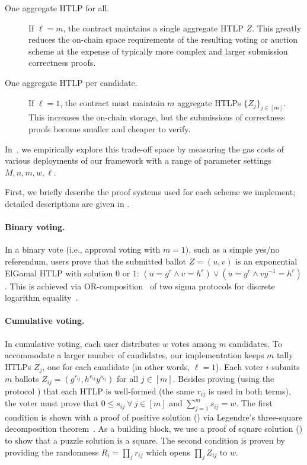 \begin{description}
    \item[One aggregate HTLP for all.] If $\ell=m$, the contract maintains a single aggregate HTLP $Z$. This greatly reduces the on-chain space requirements of the resulting voting or auction scheme at the expense of typically more complex and larger submission correctness proofs.
    \item[One aggregate HTLP per candidate.] If $\ell=1$, the contract must maintain $m$ aggregate HTLPs $\{Z_j\}_{j\in[m]}$. This increases the on-chain storage, but the submissions of correctness proofs become smaller and cheaper to verify.
\end{description}
In~, we empirically explore this trade-off space by measuring the gas costs of various deployments of our framework with a range of parameter settings $M,n,m,w,\ell$.

First, we briefly describe the proof systems used for each scheme we implement; detailed descriptions are given in .

\paragraph{Binary voting.} 
In a binary vote (i.e., approval voting with $m=1$), such as a simple yes/no referendum, users prove that the submitted ballot $Z=(u,v)$ is an exponential ElGamal HTLP with solution $0$ or $1$: $(u=g^r\land v=h^r)\lor(u=g^r\land vy^{-1}=h^r)$. This is achieved via OR-composition~\cite{C:CraDamSch94} of two sigma protocols for discrete logarithm equality~\cite{C:ChaPed92}.

\paragraph{Cumulative voting.}
In cumulative voting, each user distributes $w$ votes among $m$ candidates. To accommodate a larger number of candidates, our implementation keeps $m$ tally HTLPs $Z_j$, one for each candidate (in other words, $\ell = 1$). Each voter $i$ submits $m$ ballots $Z_{ij} = (g^{r_{ij}},h^{r_{ij}}y^{s_{ij}})$ for all $j\in[m]$. Besides proving (using the protocol \zkpoks) that each HTLP is well-formed (the same $r_{ij}$ is used in both terms), the voter must prove that $0 \leq s_{ij}~\forall\ j\in[m]$ and $\sum^m_{j=1} s_{ij}=w$. The first condition is shown with a proof of positive solution (\zkpopos) via Legendre's three-square decomposition theorem~\cite{ACNS:Groth05}. As a building block, we use a proof of square solution (\zkposqs) to show that a puzzle solution is a square. The second condition is proven by providing the randomness $R_i = \prod_j r_{ij}$ which opens $\prod_{j} Z_{ij}$ to $w$.

